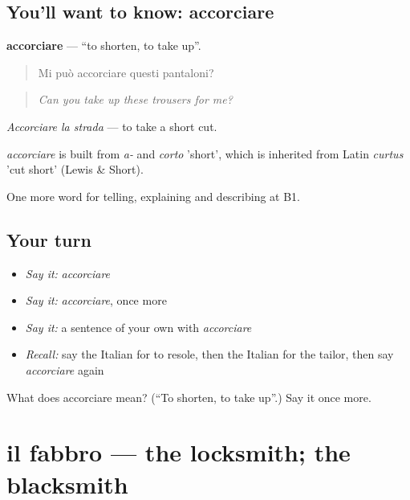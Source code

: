 \subsection*{You'll want to know: accorciare}
\textbf{accorciare} — \textquotedblleft{}to shorten, to take up\textquotedblright{}.

\begin{quote}
Mi può accorciare questi pantaloni?
\end{quote}

\begin{quote}
\emph{Can you take up these trousers for me?}
\end{quote}

\emph{Accorciare la strada} — to take a short cut.

\begin{cousinweb}
\emph{accorciare} is built from \emph{a-} and \emph{corto} 'short', which is inherited from Latin \emph{curtus} 'cut short' (Lewis \& Short).
\end{cousinweb}

\begin{grammarlens}[title={What you've built}]
One more word for telling, explaining and describing at B1.
\end{grammarlens}

\subsection*{Your turn}
\begin{itemize}
\raggedright
  \item \emph{Say it:} \emph{accorciare}
  \item \emph{Say it:} \emph{accorciare}, once more
  \item \emph{Say it:} a sentence of your own with \emph{accorciare}
  \item \emph{Recall:} say the Italian for to resole, then the Italian for the tailor, then say \emph{accorciare} again
\end{itemize}

\begin{tcolorbox}[breakable,colback=teal!4,colframe=teal!35!black,title={Before you move on}]
What does accorciare mean? (\textquotedblleft{}To shorten, to take up\textquotedblright{}.) Say it once more.
\end{tcolorbox}
\section[il fabbro]{il fabbro — the locksmith; the blacksmith}

